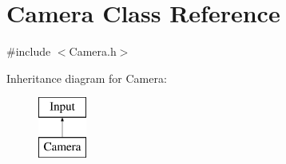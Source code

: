 \hypertarget{class_camera}{}\section{Camera Class Reference}
\label{class_camera}


{\ttfamily \#include $<$Camera.\+h$>$}

Inheritance diagram for Camera\+:\begin{figure}[H]
\begin{center}
\leavevmode
\includegraphics[height=2.000000cm]{class_camera}
\end{center}
\end{figure}
